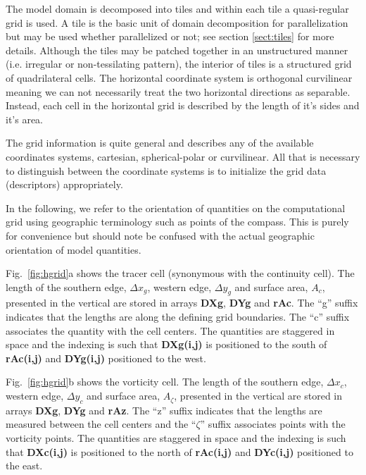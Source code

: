 The model domain is decomposed into tiles and within each tile a
quasi-regular grid is used. A tile is the basic unit of domain
decomposition for parallelization but may be used whether parallelized
or not; see section \ref{sect:tiles} for more details. Although the
tiles may be patched together in an unstructured manner
(i.e. irregular or non-tessilating pattern), the interior of tiles is
a structured grid of quadrilateral cells. The horizontal coordinate
system is orthogonal curvilinear meaning we can not necessarily treat
the two horizontal directions as separable. Instead, each cell in the
horizontal grid is described by the length of it's sides and it's
area.

The grid information is quite general and describes any of the
available coordinates systems, cartesian, spherical-polar or
curvilinear. All that is necessary to distinguish between the
coordinate systems is to initialize the grid data (descriptors)
appropriately.

In the following, we refer to the orientation of quantities on the
computational grid using geographic terminology such as points of the
compass.
This is purely for convenience but should note be confused
with the actual geographic orientation of model quantities.

Fig.~\ref{fig:hgrid}a shows the tracer cell (synonymous with the
continuity cell). The length of the southern edge, $\Delta x_g$,
western edge, $\Delta y_g$ and surface area, $A_c$, presented in the
vertical are stored in arrays {\bf DXg}, {\bf DYg} and {\bf rAc}.
The ``g'' suffix indicates that the lengths are along the defining
grid boundaries. The ``c'' suffix associates the quantity with the
cell centers. The quantities are staggered in space and the indexing
is such that {\bf DXg(i,j)} is positioned to the south of {\bf
rAc(i,j)} and {\bf DYg(i,j)} positioned to the west.

Fig.~\ref{fig:hgrid}b shows the vorticity cell. The length of the
southern edge, $\Delta x_c$, western edge, $\Delta y_c$ and surface
area, $A_\zeta$, presented in the vertical are stored in arrays {\bf
DXg}, {\bf DYg} and {\bf rAz}.
The ``z'' suffix indicates that the lengths are measured between the
cell centers and the ``$\zeta$'' suffix associates points with the
vorticity points. The quantities are staggered in space and the
indexing is such that {\bf DXc(i,j)} is positioned to the north of
{\bf rAc(i,j)} and {\bf DYc(i,j)} positioned to the east.

